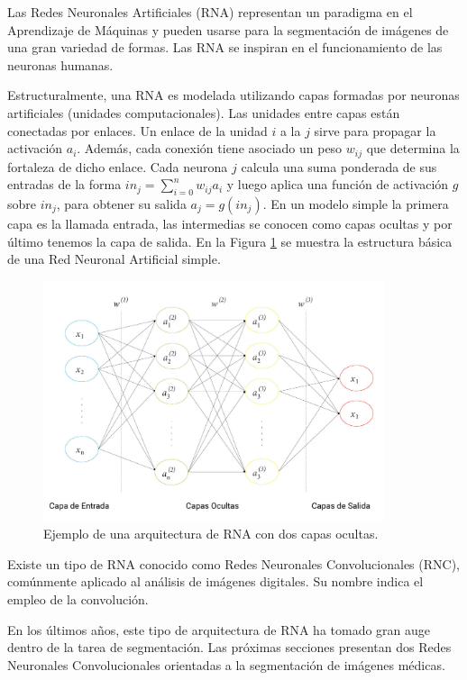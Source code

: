 Las Redes Neuronales Artificiales (RNA) representan un paradigma en el Aprendizaje de Máquinas y pueden usarse para la segmentación de imágenes de una gran variedad de formas. Las RNA se inspiran en el funcionamiento de las neuronas humanas.

Estructuralmente, una RNA es modelada utilizando capas formadas por neuronas artificiales (unidades computacionales). Las unidades entre capas están conectadas por enlaces. Un enlace de la unidad $i$ a la $j$ sirve para propagar la activación $a_i$. Además, cada conexión tiene asociado un peso $w_{ij}$ que determina la fortaleza de dicho enlace. Cada neurona $j$ calcula una suma ponderada de sus entradas de la forma $in_j = \displaystyle\sum_{i = 0}^{n} w_{ij}a_i$ y luego aplica una función de activación $g$ sobre $in_j$, para obtener su salida $a_j = g(in_j)$. En un modelo simple la primera capa es la llamada entrada, las intermedias se conocen como capas ocultas y por último tenemos la capa de salida. En la Figura \ref{fig:rna} se muestra la estructura básica de una Red Neuronal Artificial simple.

\begin{figure}[ht]
	\centering
	\includegraphics[width=10cm]{./Graphics/rna.png}
	\caption{Ejemplo de una arquitectura de RNA con dos capas ocultas.}
	\label{fig:rna}
\end{figure}

Existe un tipo de RNA conocido como Redes Neuronales Convolucionales (RNC), comúnmente aplicado al análisis de imágenes digitales. Su nombre indica el empleo de la convolución.

En los últimos años, este tipo de arquitectura de RNA ha tomado gran auge dentro de la tarea de segmentación. Las próximas secciones presentan dos Redes Neuronales Convolucionales orientadas a la segmentación de imágenes médicas.

